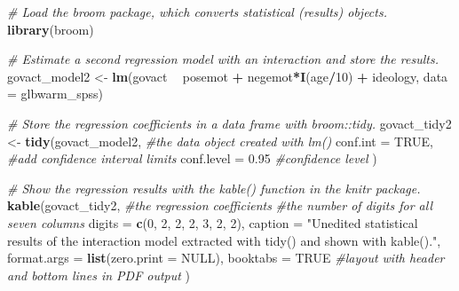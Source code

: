 \documentclass[doc,floatsintext]{apa6}
\newenvironment{Shaded}{\begin{snugshade}}{\end{snugshade}}
\newcommand{\KeywordTok}[1]{\textcolor[rgb]{0.13,0.29,0.53}{\textbf{#1}}}
\newcommand{\DataTypeTok}[1]{\textcolor[rgb]{0.13,0.29,0.53}{#1}}
\newcommand{\DecValTok}[1]{\textcolor[rgb]{0.00,0.00,0.81}{#1}}
\newcommand{\FloatTok}[1]{\textcolor[rgb]{0.00,0.00,0.81}{#1}}
\newcommand{\StringTok}[1]{\textcolor[rgb]{0.31,0.60,0.02}{#1}}
\newcommand{\CommentTok}[1]{\textcolor[rgb]{0.56,0.35,0.01}{\textit{#1}}}
\newcommand{\OtherTok}[1]{\textcolor[rgb]{0.56,0.35,0.01}{#1}}
\newcommand{\OperatorTok}[1]{\textcolor[rgb]{0.81,0.36,0.00}{\textbf{#1}}}
\newcommand{\NormalTok}[1]{#1}
\begin{document}
\begin{Shaded}
\begin{Highlighting}[]
\CommentTok{# Load the broom package, which converts statistical (results) objects.}
\KeywordTok{library}\NormalTok{(broom)}

\CommentTok{# Estimate a second regression model with an interaction and store the results.}
\NormalTok{govact_model2 <-}\StringTok{ }\KeywordTok{lm}\NormalTok{(govact }\OperatorTok{~}\StringTok{ }\NormalTok{posemot }\OperatorTok{+}\StringTok{ }\NormalTok{negemot}\OperatorTok{*}\KeywordTok{I}\NormalTok{(age}\OperatorTok{/}\DecValTok{10}\NormalTok{) }\OperatorTok{+}\StringTok{ }\NormalTok{ideology,}
                   \DataTypeTok{data =}\NormalTok{ glbwarm_spss)}

\CommentTok{# Store the regression coefficients in a data frame with broom::tidy.}
\NormalTok{govact_tidy2 <-}\StringTok{ }\KeywordTok{tidy}\NormalTok{(govact_model2, }\CommentTok{#the data object created with lm()}
                    \DataTypeTok{conf.int =} \OtherTok{TRUE}\NormalTok{, }\CommentTok{#add confidence interval limits}
                    \DataTypeTok{conf.level =} \FloatTok{0.95} \CommentTok{#confidence level}
\NormalTok{                    )}

\CommentTok{# Show the regression results with the kable() function in the knitr package.}
\KeywordTok{kable}\NormalTok{(govact_tidy2, }\CommentTok{#the regression coefficients}
      \CommentTok{#the number of digits for all seven columns}
      \DataTypeTok{digits =} \KeywordTok{c}\NormalTok{(}\DecValTok{0}\NormalTok{, }\DecValTok{2}\NormalTok{, }\DecValTok{2}\NormalTok{, }\DecValTok{2}\NormalTok{, }\DecValTok{3}\NormalTok{, }\DecValTok{2}\NormalTok{, }\DecValTok{2}\NormalTok{), }
      \DataTypeTok{caption =} \StringTok{"Unedited statistical results of the interaction model }
\StringTok{                 extracted with tidy() and shown with kable()."}\NormalTok{,}
      \DataTypeTok{format.args =} \KeywordTok{list}\NormalTok{(}\DataTypeTok{zero.print =} \OtherTok{NULL}\NormalTok{),}
      \DataTypeTok{booktabs =} \OtherTok{TRUE} \CommentTok{#layout with header and bottom lines in PDF output}
\NormalTok{      )}
\end{Highlighting}
\end{Shaded}
\end{document}
